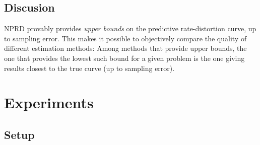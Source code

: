 \documentclass[11pt,letterpaper]{article}
\newcounter{theorem}
\newtheorem{proposition}[theorem]{Proposition}
\begin{document}
%
%
%


\subsection{Discusion}

NPRD provably provides \emph{upper bounds} on the predictive rate-distortion curve, up to sampling error.
This makes it possible to objectively compare the quality of different estimation methods:
Among methods that provide upper bounds, the one that provides the lowest such bound for a given problem is the one giving results closest to the true curve (up to sampling error).

\section{Experiments}

\subsection{Setup}
\end{document}
